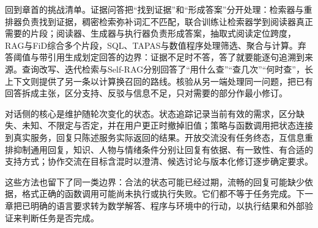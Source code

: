 回到章首的挑战清单。证据问答把“找到证据”和“形成答案”分开处理：检索器与重排器负责找到证据，稠密检索弥补词汇不匹配，联合训练让检索器学到阅读器真正需要的片段；阅读器、生成器与执行器负责形成答案，抽取式阅读定位跨度，RAG与FiD综合多个片段，SQL、TAPAS与数值程序处理筛选、聚合与计算。弃答阈值与带引用生成划定回答的边界：证据不足时不答，答了就要能逐句追溯到来源。查询改写、迭代检索与Self-RAG分别回答了“用什么查”“查几次”“何时查”，长上下文则提供了另一条以计算换召回的路线。核验从另一端处理同一问题，把已有回答拆成主张，区分支持、反驳与信息不足，只对需要的部分作最小修订。

对话侧的核心是维护随轮次变化的状态。状态追踪记录当前有效的需求，区分缺失、未知、不限定与否定，并在用户更正时撤掉旧值；策略与函数调用把状态连接到真实服务，回复只陈述服务实际返回的结果。开放交流没有任务终态，互信息重排抑制通用回复，知识、人物与情绪条件分别让回复有依据、有一致性、有合适的支持方式；协作交流在目标含混时以澄清、候选讨论与版本化修订逐步确定要求。

这些方法也留下了同一类边界：合法的状态可能已经过期，流畅的回复可能缺少依据，格式正确的函数调用可能尚未执行或执行失败。它们都不等于任务完成。下一章把已明确的语言要求转为数学解答、程序与环境中的行动，以执行结果和外部验证来判断任务是否完成。

